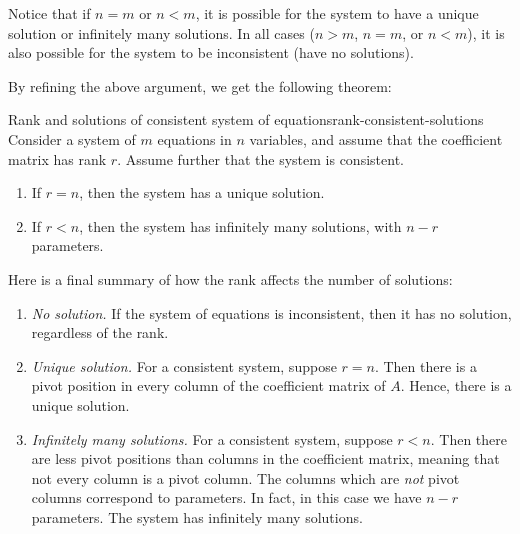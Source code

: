 Notice that if $n=m$ or $n<m$, it is possible for the system to have a
unique solution or infinitely many solutions. In all cases ($n>m$,
$n=m$, or $n<m$), it is also possible for the system to be
inconsistent (have no solutions).

By refining the above argument, we get the following theorem:

\begin{theorem}{Rank and solutions of consistent system of equations}{rank-consistent-solutions}
  Consider a system of $m$ equations in $n$ variables, and assume that
  the coefficient matrix has rank $r$. Assume further that the system
  is consistent.
\begin{enumerate}
\item If $r=n$, then the system has a unique solution.
\item If $r<n$, then the system has infinitely many solutions, with $n-r$ parameters.
\end{enumerate}
\end{theorem}

Here is a final summary of how the rank affects the number of
solutions:

\begin{enumerate}
\item {\em No solution.} If the system of equations is inconsistent,
  then it has no solution, regardless of the rank.

\item {\em Unique solution.} For a consistent system, suppose
  $r=n$. Then there is a pivot position in every column of the
  coefficient matrix of $A$. Hence, there is a unique solution.

\item {\em Infinitely many solutions.} For a consistent system, suppose
  $r<n$. Then there are less pivot positions than columns in the
  coefficient matrix, meaning that not every column is a pivot
  column. The columns which are {\em not} pivot columns correspond to
  parameters. In fact, in this case we have $n-r$ parameters. The
  system has infinitely many solutions.
\end{enumerate}
